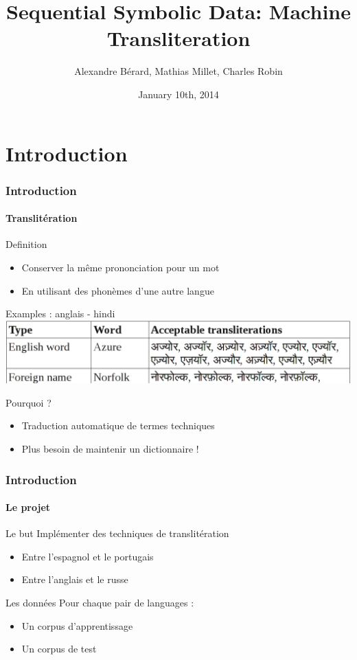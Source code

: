 \documentclass{beamer}
\title[Machine Transliteration]{Sequential Symbolic Data: Machine Transliteration}
\author[A.~Bérard, M.~Millet, C.~Robin]{Alexandre Bérard, Mathias Millet, Charles Robin}
\date{January 10th, 2014}
\begin{document}
\begin{frame}
\titlepage
\end{frame}

\section{Introduction}    
\begin{frame}
    \frametitle{Introduction}
	\framesubtitle{Translitération}
	\begin{block}{Definition}
	    \begin{itemize}
    		\item Conserver la m\^eme prononciation pour un mot
    		\item En utilisant des phonèmes d'une autre langue
    		\end{itemize}
    \end{block}	    
    
	\begin{exampleblock}{Examples : anglais - hindi}
	\includegraphics[scale=0.3]{en-in-example}
    \end{exampleblock}
    
	\begin{block}{Pourquoi ?}
	\begin{itemize}
		\item Traduction automatique de termes techniques
		\item Plus besoin de maintenir un dictionnaire !
	\end{itemize}
	\end{block}	    
    
    
\end{frame}

\begin{frame}
\frametitle{Introduction}
\framesubtitle{Le projet}

	\begin{block}{Le but}
		Implémenter des techniques de translitération 
		\begin{itemize}
		\item Entre l'espagnol et le portugais
		\item Entre l'anglais et le russe
		\end{itemize}
	\end{block}

	\begin{block}{Les données}
	Pour chaque pair de languages :		
		\begin{itemize}
		\item Un corpus d'apprentissage
		\item Un corpus de test
		\end{itemize}		
	\end{block}

\end{frame}
\end{document}
